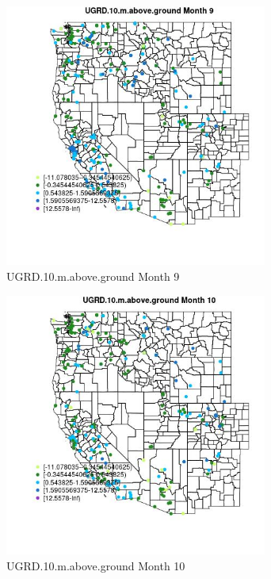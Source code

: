 \begin{figure} 
\centering  
\includegraphics[width=0.77\textwidth]{Code_Outputs/Report_ML_input_PM25_Step4_part_e_de_duplicated_aveswNAs_MapObsMo9UGRD10maboveground.jpg} 
\caption{\label{fig:Report_ML_input_PM25_Step4_part_e_de_duplicated_aveswNAsMapObsMo9UGRD10maboveground}UGRD.10.m.above.ground Month 9} 
\end{figure} 
 

\clearpage 

\begin{figure} 
\centering  
\includegraphics[width=0.77\textwidth]{Code_Outputs/Report_ML_input_PM25_Step4_part_e_de_duplicated_aveswNAs_MapObsMo10UGRD10maboveground.jpg} 
\caption{\label{fig:Report_ML_input_PM25_Step4_part_e_de_duplicated_aveswNAsMapObsMo10UGRD10maboveground}UGRD.10.m.above.ground Month 10} 
\end{figure} 
 

